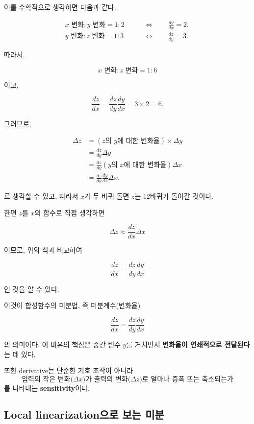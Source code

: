 \documentclass[11pt,a4paper]{article}
\begin{document}
이를 수학적으로 생각하면 다음과 같다.

\[
\begin{aligned}
x\text{ 변화}:y\text{ 변화}=1:2
&\qquad\Longleftrightarrow\qquad
\frac{dy}{dx}=2,
\\[0.5em]
y\text{ 변화}:z\text{ 변화}=1:3
&\qquad\Longleftrightarrow\qquad
\frac{dz}{dy}=3.
\end{aligned}
\]

따라서,

\[
x\text{ 변화}:z\text{ 변화}=1:6
\]

이고,

\[
\frac{dz}{dx}
=
\frac{dz}{dy}\frac{dy}{dx}
=
3\times 2
=
6.
\]

그러므로,

\[
\begin{aligned}
\Delta z
&=
\left(
z\text{의 }y\text{에 대한 변화율}
\right)
\times
\Delta y
\\[0.4em]
&=
\frac{dz}{dy}\Delta y
\\[0.4em]
&=
\frac{dz}{dy}
\left(
y\text{의 }x\text{에 대한 변화율}
\right)
\Delta x
\\[0.4em]
&=
\frac{dz}{dy}
\frac{dy}{dx}
\Delta x .
\end{aligned}
\]

로 생각할 수 있고, 따라서 $x$가 두 바퀴 돌면
$z$는 $12$바퀴가 돌아갈 것이다.

한편 $z$를 $x$의 함수로 직접 생각하면

\[
\Delta z
\approx
\frac{dz}{dx}\Delta x
\]

이므로, 위의 식과 비교하여

\[
\boxed{
\frac{dz}{dx}
=
\frac{dz}{dy}
\frac{dy}{dx}
}
\]

인 것을 알 수 있다.

이것이 합성함수의 미분법, 즉 미분계수(변화율)

\[
\frac{dz}{dx}
=
\frac{dz}{dy}
\frac{dy}{dx}
\]

의 의미이다. 이 비유의 핵심은 중간 변수 $y$를 거치면서 \textbf{변화율이 연쇄적으로 전달된다}는 데 있다.

또한 derivative는 단순한 기호 조작이 아니라
\[
\boxed{\text{입력의 작은 변화($\Delta x$)가 출력의 변화($\Delta z$)로 얼마나 증폭 또는 축소되는가}}
\]
를 나타내는 \textbf{sensitivity}이다. 

\subsection{Local linearization으로 보는 미분}
\end{document}

